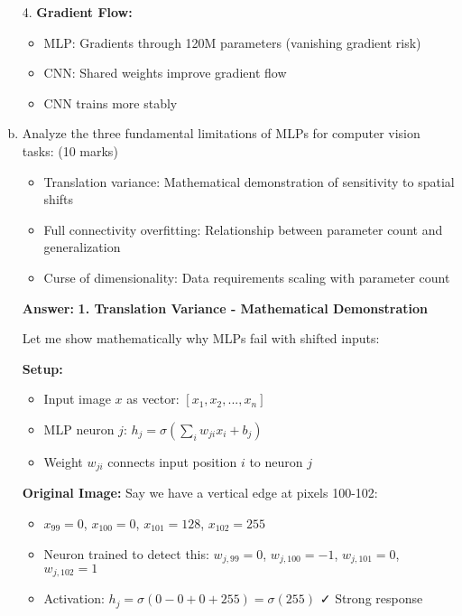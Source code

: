 \documentclass[12pt]{article}
\newcommand{\answer}[1]{{\color{answercolor}\textbf{Answer:} #1}}
\newcommand{\explanation}[1]{{\color{explanationcolor}#1}}
\begin{document}
\begin{enumerate}[(a)]
{{    4. \textbf{Gradient Flow:}
    \begin{itemize}
        \item MLP: Gradients through 120M parameters (vanishing gradient risk)
        \item CNN: Shared weights improve gradient flow
        \item CNN trains more stably
    \end{itemize}
    }
    }
    
    \item Analyze the three fundamental limitations of MLPs for computer vision tasks: \hfill (10 marks)
    \begin{itemize}
        \item Translation variance: Mathematical demonstration of sensitivity to spatial shifts
        \item Full connectivity overfitting: Relationship between parameter count and generalization
        \item Curse of dimensionality: Data requirements scaling with parameter count
    \end{itemize}
    
    \answer{
    \textbf{1. Translation Variance - Mathematical Demonstration}
    
    \explanation{
    Let me show mathematically why MLPs fail with shifted inputs:
    
    \textbf{Setup:}
    \begin{itemize}
        \item Input image $x$ as vector: $[x_1, x_2, ..., x_n]$
        \item MLP neuron $j$: $h_j = \sigma(\sum_i w_{ji} x_i + b_j)$
        \item Weight $w_{ji}$ connects input position $i$ to neuron $j$
    \end{itemize}
    
    \textbf{Original Image:}
    Say we have a vertical edge at pixels 100-102:
    \begin{itemize}
        \item $x_{99} = 0$, $x_{100} = 0$, $x_{101} = 128$, $x_{102} = 255$
        \item Neuron trained to detect this: $w_{j,99} = 0$, $w_{j,100} = -1$, $w_{j,101} = 0$, $w_{j,102} = 1$
        \item Activation: $h_j = \sigma(0 - 0 + 0 + 255) = \sigma(255)$ ✓ Strong response
    \end{itemize}
    
}}
\end{enumerate}
\end{document}
